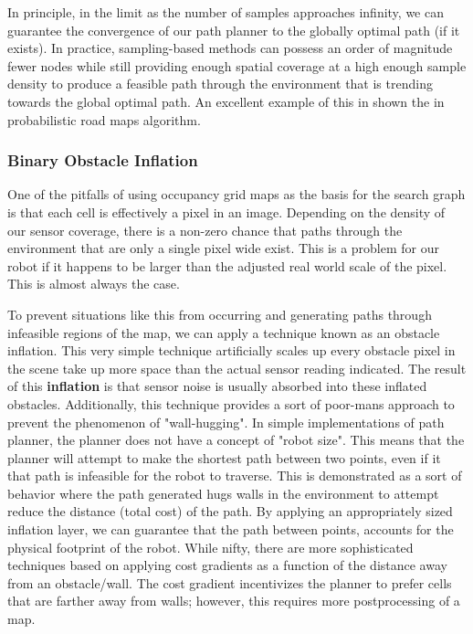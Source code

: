 In principle, in the limit as the number of samples approaches infinity, we can guarantee the convergence of our path planner to the globally optimal path (if it exists). In practice, sampling-based methods can possess an order of magnitude fewer nodes while still providing enough spatial coverage at a high enough sample density to produce a feasible  path through the environment that is trending towards the global optimal path. An excellent example of this in shown the in probabilistic road maps algorithm. 

\subsubsection{Binary Obstacle Inflation}

One of the pitfalls of using occupancy grid maps as the basis for the search graph is that each cell is effectively a pixel in an image. Depending on the density of our sensor coverage, there is a non-zero chance that paths through the environment that are only a single pixel wide exist. This is a problem for our robot if it happens to be larger than the adjusted real world scale of the pixel. This is almost always the case. 

To prevent situations like this from occurring and generating paths through infeasible regions of the map, we can apply a technique known as an obstacle inflation. This very simple technique artificially scales up every obstacle pixel in the scene take up more space than the actual sensor reading indicated. The result of this \textbf{inflation} is that sensor noise is usually absorbed into these inflated obstacles. Additionally, this technique provides a sort of poor-mans approach to prevent the phenomenon of "wall-hugging". In simple implementations of path planner, the planner does not have a concept of "robot size". This means that the planner will attempt to make the shortest path between two points, even if it that path is infeasible for the robot to traverse. This is demonstrated as a sort of behavior where the path generated hugs walls in the environment to attempt reduce the distance (total cost) of the path. By applying an appropriately sized inflation layer, we can guarantee that the path between points, accounts for the physical footprint of the robot. While nifty, there are more sophisticated techniques based on applying cost gradients as a function of the distance away from an obstacle/wall. The cost gradient incentivizes the planner to prefer cells that are farther away from walls; however, this requires more postprocessing of a map. 